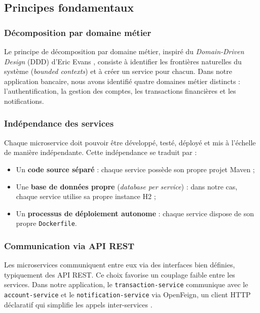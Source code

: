 \documentclass[12pt,a4paper]{article}
\begin{document}
\subsection{Principes fondamentaux}

\subsubsection{Décomposition par domaine métier}

Le principe de décomposition par domaine métier, inspiré du \textit{Domain-Driven Design} (DDD) d'Eric Evans \cite{evans2003}, consiste à identifier les frontières naturelles du système (\textit{bounded contexts}) et à créer un service pour chacun. Dans notre application bancaire, nous avons identifié quatre domaines métier distincts : l'authentification, la gestion des comptes, les transactions financières et les notifications.

\subsubsection{Indépendance des services}

Chaque microservice doit pouvoir être développé, testé, déployé et mis à l'échelle de manière indépendante. Cette indépendance se traduit par :
\begin{itemize}
    \item Un \textbf{code source séparé} : chaque service possède son propre projet Maven ;
    \item Une \textbf{base de données propre} (\textit{database per service}) : dans notre cas, chaque service utilise sa propre instance H2 ;
    \item Un \textbf{processus de déploiement autonome} : chaque service dispose de son propre \texttt{Dockerfile}.
\end{itemize}

\subsubsection{Communication via API REST}

Les microservices communiquent entre eux via des interfaces bien définies, typiquement des API REST. Ce choix favorise un couplage faible entre les services. Dans notre application, le \texttt{transaction-service} communique avec le \texttt{account-service} et le \texttt{notification-service} via OpenFeign, un client HTTP déclaratif qui simplifie les appels inter-services \cite{springcloud2024}.
\end{document}
